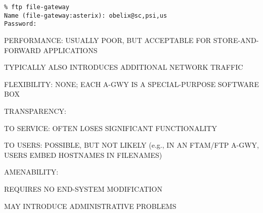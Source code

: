 \begin{bwslide}

\vskip1.5in
\begin{verbatim}
% ftp file-gateway
Name (file-gateway:asterix): obelix@sc,psi,us
Password:
\end{verbatim}
\end{bwslide}






\begin{bwslide}

\begin{nrtc}
\item	PERFORMANCE: USUALLY POOR, BUT ACCEPTABLE FOR STORE-AND-FORWARD
	APPLICATIONS
    \begin{nrtc}
    \item	TYPICALLY ALSO INTRODUCES ADDITIONAL NETWORK TRAFFIC
    \end{nrtc}

\item	FLEXIBILITY: NONE; EACH A-GWY IS A SPECIAL-PURPOSE SOFTWARE BOX

\item	TRANSPARENCY: 
    \begin{nrtc}
    \item	TO SERVICE: OFTEN LOSES SIGNIFICANT FUNCTIONALITY

    \item	TO USERS: POSSIBLE, BUT NOT LIKELY (e.g., IN AN FTAM/FTP A-GWY,
		USERS EMBED HOSTNAMES IN FILENAMES)
    \end{nrtc}

\item	AMENABILITY:
    \begin{nrtc}
    \item	REQUIRES NO END-SYSTEM MODIFICATION

    \item	MAY INTRODUCE ADMINISTRATIVE PROBLEMS
    \end{nrtc}
\end{nrtc}
\end{bwslide}


